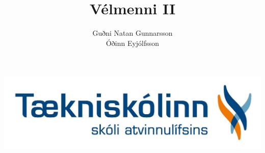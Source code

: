\documentclass[a4pape]{article}
\begin{document}
\begin{titlepage}
\title{Vélmenni II}
\author{Guðni Natan Gunnarsson \\ Óðinn Eyjólfsson}
\includegraphics[scale=.45]{img/logotskoli_2}
\end{titlepage}

\maketitle
\tableofcontents

\newpage

\newpage

\newpage

\newpage

\newpage

\newpage

\newpage



\newpage

\end{document}
